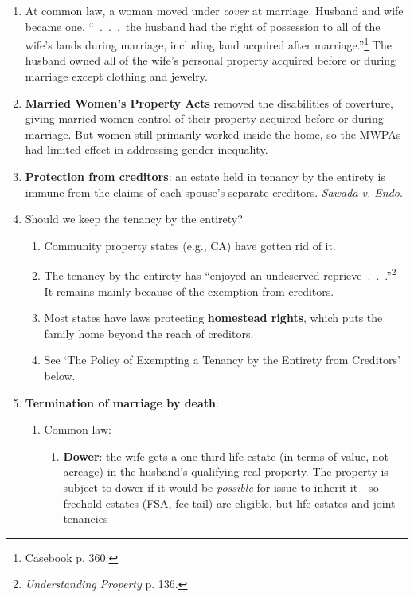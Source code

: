 \begin{enumerate}
    \item At common law, a woman moved under \emph{cover} at marriage. Husband 
    and wife became one. ``~.~.~.~the husband had the right of possession to 
    all of the wife's lands during marriage, including land acquired after 
    marriage.''\footnote{Casebook p. 360.} The husband owned all of the wife's 
    personal property acquired before or during marriage except clothing and 
    jewelry.
    \item \textbf{Married Women's Property Acts} removed the disabilities of 
    coverture, giving married women control of their property acquired before 
    or during marriage. But women still primarily worked inside the home, so 
    the MWPAs had limited effect in addressing gender inequality.
    \item \textbf{Protection from creditors}:  an estate held in tenancy by 
    the entirety is immune from the claims of each spouse's separate 
    creditors. \emph{Sawada v. Endo}.
    \item Should we keep the tenancy by the entirety?
    \begin{enumerate}
        \item Community property states (e.g., CA) have gotten rid of it.
        \item The tenancy by the entirety has ``enjoyed an undeserved 
        reprieve~.~.~.''\footnote{\emph{Understanding Property} p. 136.} It 
        remains mainly because of the exemption from creditors.
        \item Most states have laws protecting \textbf{homestead rights}, 
        which puts the family home beyond the reach of creditors.
        \item See `The Policy of Exempting a Tenancy by the Entirety from 
        Creditors' below.
    \end{enumerate}
    \item \textbf{Termination of marriage by death}:
    \begin{enumerate}
        \item Common law:
        \begin{enumerate}
            \item \textbf{Dower}: the wife gets a one-third life estate (in 
            terms of value, not acreage) in the husband's qualifying real 
            property. The property is subject to dower if it would be 
            \emph{possible} for issue to inherit it---so freehold estates 
            (FSA, fee tail) are eligible, but life estates and joint tenancies 

\end{enumerate}
\end{enumerate}
\end{enumerate}
